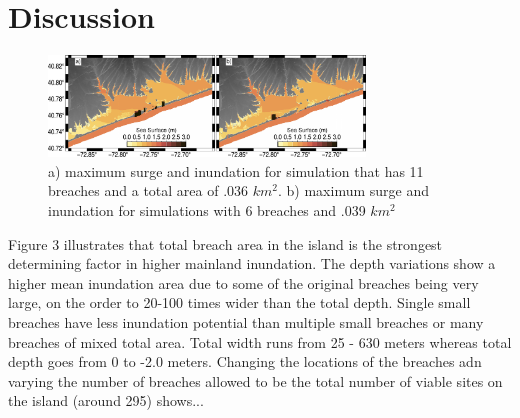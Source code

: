 \documentclass{coastal_paper}
\begin{document}


\section{Discussion}


\begin{figure}
    \centering
    \includegraphics[width=0.75\textwidth]{6_vs_11_breaches.pdf}
    \caption{a) maximum surge and inundation for simulation that has 11 breaches and a total area of .036 $km^2$. b) maximum surge and inundation for simulations with 6 breaches and .039 $km^2$}
    \label{fig5}
\end{figure}



Figure 3 illustrates that total breach area in the island is the strongest determining factor in higher mainland inundation. The depth variations show a higher mean inundation area due to some of the original breaches being very large, on the order to 20-100 times wider than the total depth. Single small breaches have less inundation potential than multiple small breaches or many breaches of mixed total area. Total width runs from 25 - 630 meters whereas total depth goes from 0 to -2.0 meters. 
Changing the locations of the breaches adn varying the number of breaches allowed to be the total number of viable sites on the island (around 295) shows...%
\end{document}
